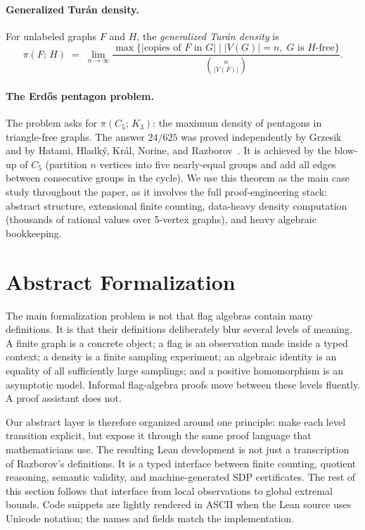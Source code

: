 \documentclass{article}
\newcommand{\tdensity}[2]{\pi(#1;\,#2)}
\begin{document}
\paragraph{Generalized Turán density.}
For unlabeled graphs $F$ and $H$, the \emph{generalized Turán density} is
\[
  \tdensity{F}{H}
  \;=\;
  \lim_{n\to\infty}
  \frac{\max\bigl\{|\text{copies of }F\text{ in }G|
                   \mid |V(G)|=n,\; G \text{ is }H\text{-free}\bigr\}}
       {\binom{n}{|V(F)|}}.
\]

\paragraph{The Erd\H{o}s pentagon problem.}
The problem asks for $\tdensity{C_5}{K_3}$: the maximum density of
pentagons in triangle-free graphs.  The answer $24/625$ was proved
independently by Grzesik~\cite{grzesik2012} and by Hatami, Hladk\'y, Kr\'al,
Norine, and Razborov~\cite{hatami2012}.  It is achieved by the blow-up of
$C_5$ (partition $n$ vertices into five nearly-equal groups and add all edges
between consecutive groups in the cycle).  We use this theorem as the main
case study throughout the paper, as it involves the full proof-engineering
stack: abstract structure, extensional finite counting, data-heavy density
computation (thousands of rational values over 5-vertex graphs), and heavy
algebraic bookkeeping.


\section{Abstract Formalization}
\label{sec:abstract}

The main formalization problem is not that flag algebras contain many
definitions.  It is that their definitions deliberately blur several levels of
meaning.  A finite graph is a concrete object; a flag is an observation made
inside a typed context; a density is a finite sampling experiment; an algebraic
identity is an equality of all sufficiently large samplings; and a positive
homomorphism is an asymptotic model.  Informal flag-algebra proofs move between
these levels fluently.  A proof assistant does not.

Our abstract layer is therefore organized around one principle: make each
level transition explicit, but expose it through the same proof language that
mathematicians use.  The resulting Lean development is not just a transcription
of Razborov's definitions.  It is a typed interface between finite counting,
quotient reasoning, semantic validity, and machine-generated SDP certificates.
The rest of this section follows that interface from local observations to
global extremal bounds.  Code snippets are lightly rendered in ASCII when the
Lean source uses Unicode notation; the names and fields match the
implementation.
\end{document}
